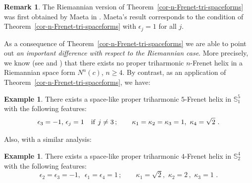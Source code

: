 \documentclass[11pt]{amsart}
\theoremstyle{plain}
\theoremstyle{definition}
\newtheorem{example}      [theorem]  {Example}
\newtheorem{remark}       [theorem]  {Remark}
\numberwithin{equation}{section}
\def \s {{\mathbb S}}
\begin{document}
\begin{remark}
The Riemannian version of Theorem~\ref{cor-n-Frenet-tri-spaceforms} was first obtained by Maeta in \cite[Proposition~5.9]{MR3007953}. Maeta's result corresponds to the condition of Theorem~\ref{cor-n-Frenet-tri-spaceforms} with $\epsilon_j=1$ for all $j$.
\end{remark}
As a consequence of Theorem~\ref{cor-n-Frenet-tri-spaceforms} we are able to point out \textit{an important  difference with respect to the Riemannian case}. More precisely, we know (see \cite{MR3007953} and \cite[Theorem~5.1]{MR2}) that there exists no proper triharmonic $n$-Frenet helix in a Riemannian space form $N^n(c)$, $n \geq 4$. By contrast, as an application of Theorem~\ref{cor-n-Frenet-tri-spaceforms}, we have: 
\begin{example}\label{cor-controes-triharmonic}
There exists a space-like proper triharmonic $5$-Frenet helix in $\s^5_1$ with the following features:
\[
\epsilon_3=-1,\, \epsilon_j=1 \quad {\rm if}\,\,j\neq 3 \,;\quad \quad
\kappa_1= \kappa_2=\kappa_3=1,\,\, \kappa_4=\sqrt{2}\, \,.
\]
\end{example}
Also, with a similar analysis:
\begin{example}\label{cor-controes-triharmonic-bis}
There exists a space-like proper triharmonic $4$-Frenet helix in $\s^4_2$ with the following features:
\[
\epsilon_2=\epsilon_3=-1,\,\,\, \epsilon_1=\epsilon_4=1  \,;\quad \quad
\kappa_1=\sqrt{2},\,\, \kappa_2=2\,,\,\, \kappa_3=1\, \,.
\]
\end{example}
\vspace{3mm}
\end{document}

